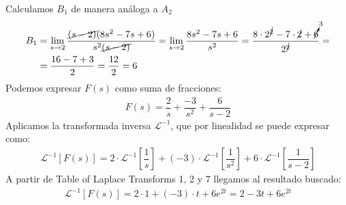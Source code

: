 \documentclass{article}
\begin{document}
Calculamos $B_1$ de manera análoga a $A_2$
\begin{align*}
    B_1
    &= \lim_{s \to 2} \dfrac{\cancel{(s - 2)} (8s^2 - 7s + 6)}{s^2 \cancel{(s - 2)}}
    = \lim_{s \to 2} \dfrac{8s^2 - 7s + 6}{s^2} 
    = \dfrac{8 \cdot 2^{\cancel{2}} - 7 \cdot \cancel{2} + \cancelto{3}{6}}{2^{\cancel{2}}} = \\
    &= \dfrac{16 - 7 + 3}{2}
    = \dfrac{12}{2}
    = 6
\end{align*}
Podemos expresar $F(s)$ como suma de fracciones:
\begin{align*}
    F(s)
    = \dfrac{2}{s}
    + \dfrac{-3}{s^2}
    + \dfrac{6}{s - 2}
\end{align*}
Aplicamos la transformada inversa $\mathcal{L}^{-1}$,
que por linealidad se puede expresar como:
\begin{align*}
    \mathcal{L}^{-1}[F(s)]
    = 2\cdot\mathcal{L}^{-1}\left[\dfrac{1}{s}\right]
    + (-3)\cdot\mathcal{L}^{-1}\left[\dfrac{1}{s^2}\right]
    + 6\cdot\mathcal{L}^{-1}\left[\dfrac{1}{s - 2}\right]
\end{align*}
A partir de Table of Laplace Transforms 1, 2 y 7  llegamos al resultado buscado:
\begin{align*}
    \mathcal{L}^{-1}[F(s)]
    = 2 \cdot 1
    + (-3) \cdot t
    + 6 e^{2t}
    = 2
    - 3t
    + 6 e^{2t}
\end{align*}
\end{document}
